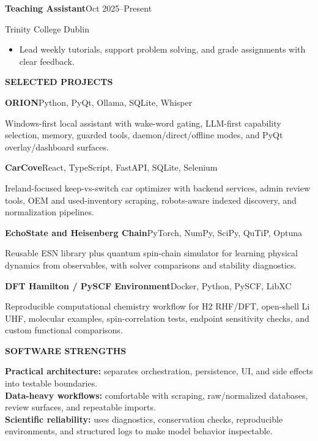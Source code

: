 \documentclass[10pt,a4paper]{article}
\newcommand{\sectiontitle}[1]{%
  \vspace{8.5pt}
  {\small\bfseries\color{accent}\MakeUppercase{#1}}\par
  \vspace{2.5pt}{\color{rule}\hrule height 0.55pt}\vspace{4.8pt}
}
\newcommand{\role}[3]{%
  {\bfseries #1}\hfill{\small\color{muted}#2}\par
  {\small\color{muted}#3}\par
}
\newcommand{\project}[3]{%
  {\bfseries #1}\hfill{\small\color{muted}#2}\par
  {\small #3}\par\vspace{4pt}
}
\begin{document}
\begin{minipage}[t][0.835\textheight][t]{0.645\linewidth}
\role{Teaching Assistant}{Oct 2025--Present}{Trinity College Dublin}
\begin{itemize}
  \item Lead weekly tutorials, support problem solving, and grade assignments with clear feedback.
\end{itemize}

\sectiontitle{Selected Projects}

\project{ORION}{Python, PyQt, Ollama, SQLite, Whisper}{Windows-first local assistant with wake-word gating, LLM-first capability selection, memory, guarded tools, daemon/direct/offline modes, and PyQt overlay/dashboard surfaces.}

\project{CarCove}{React, TypeScript, FastAPI, SQLite, Selenium}{Ireland-focused keep-vs-switch car optimizer with backend services, admin review tools, OEM and used-inventory scraping, robots-aware indexed discovery, and normalization pipelines.}

\project{EchoState and Heisenberg Chain}{PyTorch, NumPy, SciPy, QuTiP, Optuna}{Reusable ESN library plus quantum spin-chain simulator for learning physical dynamics from observables, with solver comparisons and stability diagnostics.}

\project{DFT Hamilton / PySCF Environment}{Docker, Python, PySCF, LibXC}{Reproducible computational chemistry workflow for H2 RHF/DFT, open-shell Li UHF, molecular examples, spin-correlation tests, endpoint sensitivity checks, and custom functional comparisons.}

\vfill
\sectiontitle{Software Strengths}
{\small
\textbf{Practical architecture:} separates orchestration, persistence, UI, and side effects into testable boundaries.\\[2pt]
\textbf{Data-heavy workflows:} comfortable with scraping, raw/normalized databases, review surfaces, and repeatable imports.\\[2pt]
\textbf{Scientific reliability:} uses diagnostics, conservation checks, reproducible environments, and structured logs to make model behavior inspectable.
}

\end{minipage}
\end{document}
